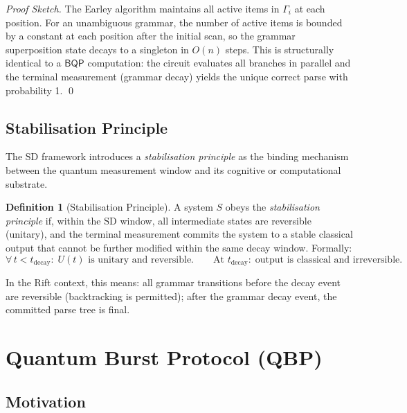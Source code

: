 \documentclass[11pt]{article}
\theoremstyle{plain}
\theoremstyle{definition}
\newtheorem{definition}[theorem]{Definition}
\theoremstyle{remark}
\newcommand{\bqp}{\ensuremath{\mathsf{BQP}}}
\newcommand{\SD}{\ensuremath{\mathrm{SD}}}   %
\begin{document}
\begin{proof}[Proof Sketch]
  The Earley algorithm maintains all active items in $\Gamma_i$ at each
  position.  For an unambiguous grammar, the number of active items is
  bounded by a constant at each position after the initial scan, so the
  grammar superposition state decays to a singleton in $O(n)$ steps.  This
  is structurally identical to a $\bqp$ computation: the circuit evaluates
  all branches in parallel and the terminal measurement (grammar decay)
  yields the unique correct parse with probability 1. \qed
\end{proof}

\subsection{Stabilisation Principle}

The \SD{} framework introduces a \emph{stabilisation principle} as the
binding mechanism between the quantum measurement window and its cognitive
or computational substrate.

\begin{definition}[Stabilisation Principle]
  A system $S$ obeys the \emph{stabilisation principle} if, within the \SD{}
  window, all intermediate states are reversible (unitary), and the terminal
  measurement commits the system to a stable classical output that cannot be
  further modified within the same decay window.  Formally:
  \[
    \forall\, t < t_{\text{decay}}:\; U(t)\text{ is unitary and reversible.}
    \qquad
    \text{At } t_{\text{decay}}:\; \text{output is classical and irreversible.}
  \]
\end{definition}

In the Rift context, this means: all grammar transitions before the decay
event are reversible (backtracking is permitted); after the grammar decay
event, the committed parse tree is final.

\section{Quantum Burst Protocol (QBP)}
\label{sec:qbp}

\subsection{Motivation}
\end{document}
